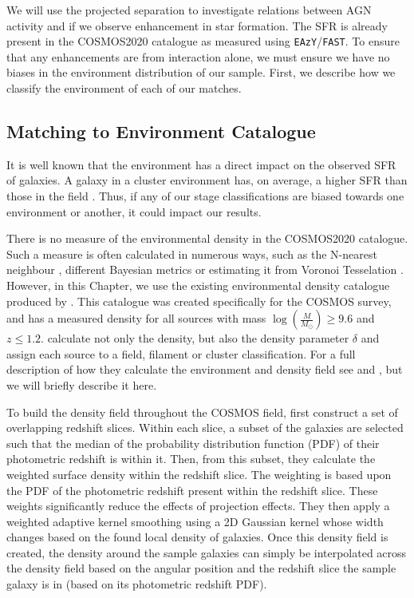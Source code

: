We will use the projected separation to investigate relations between AGN activity and if we observe enhancement in star formation. The SFR is already present in the COSMOS2020 catalogue as measured using \texttt{EAzY}/\texttt{FAST}. To ensure that any enhancements are from interaction alone, we must ensure we have no biases in the environment distribution of our sample. First, we describe how we classify the environment of each of our matches.

\subsection{Matching to Environment Catalogue}\label{data:environ}
\noindent It is well known that the environment has a direct impact on the observed SFR of galaxies. A galaxy in a cluster environment has, on average, a higher SFR than those in the field \citep{2006MNRAS.373..469B}. Thus, if any of our stage classifications are biased towards one environment or another, it could impact our results.

There is no measure of the environmental density in the COSMOS2020 catalogue. Such a measure is often calculated in numerous ways, such as the N-nearest neighbour \citep{2006MNRAS.373..469B}, different Bayesian metrics \citep{2008ApJ...674L..13C} or estimating it from Voronoi Tesselation \citep{2021inas.book...57V}. However, in this Chapter, we use the existing environmental density catalogue produced by \citet{2017ApJ...837...16D}. This catalogue was created specifically for the COSMOS survey, and has a measured density for all sources with mass $\log(\frac{M}{M_\odot}) \geq 9.6$ and $z \leq 1.2$. \citet{2017ApJ...837...16D} calculate not only the density, but also the density parameter $\delta$ and assign each source to a field, filament or cluster classification. For a full description of how they calculate the environment and density field see \citet{2015ApJ...805..121D} and \citet{2017ApJ...837...16D}, but we will briefly describe it here.

To build the density field throughout the COSMOS field, \citet{2017ApJ...837...16D} first construct a set of overlapping redshift slices. Within each slice, a subset of the galaxies are selected such that the median of the probability distribution function (PDF) of their photometric redshift is within it. Then, from this subset, they calculate the weighted surface density within the redshift slice. The weighting is based upon the PDF of the photometric redshift present within the redshift slice. These weights significantly reduce the effects of projection effects. They then apply a weighted adaptive kernel smoothing using a 2D Gaussian kernel whose width changes based on the found local density of galaxies. Once this density field is created, the density around the sample galaxies can simply be interpolated across the density field based on the angular position and the redshift slice the sample galaxy is in (based on its photometric redshift PDF).

